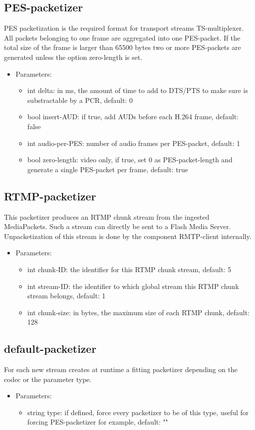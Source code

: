\subsection{PES-packetizer}
PES packetization is the required format for transport streams TS-multiplexer. All packets belonging to one frame are aggregated into one PES-packet. If the total size of the frame is larger than 65500 bytes two or more PES-packets are generated unless the option zero-length is set.
\begin{itemize}
\item Parameters:
\begin{itemize}
\item int delta: in ms, the amount of time to add to DTS/PTS to make sure is substractable by a PCR, default: 0
\item bool insert-AUD: if true, add AUDs before each H.264 frame, default: false
\item int audio-per-PES: number of audio frames per PES-packet, default: 1
\item bool zero-length: video only, if true, set 0 as PES-packet-length and generate a single PES-packet per frame, default: true
\end{itemize}
\end{itemize}
\subsection{RTMP-packetizer}
This packetizer produces an RTMP chunk stream from the ingested MediaPackets. Such a stream can directly be sent to a Flash Media Server. Unpacketization of this stream is done by the component RMTP-client internally.
\begin{itemize}
\item Parameters:
\begin{itemize}
\item int chunk-ID: the identifier for this RTMP chunk stream, default: 5
\item int stream-ID: the identifier to which global stream this RTMP chunk stream belongs, default: 1
\item int chunk-size: in bytes, the maximum size of each RTMP chunk, default: 128
\end{itemize}
\end{itemize}
\subsection{default-packetizer}
For each new stream creates at runtime a fitting packetizer depending on the codec or the parameter type.
\begin{itemize}
\item Parameters:
\begin{itemize}
\item string type: if defined, force every packetizer to be of this type, useful for forcing PES-packetizer for example, default: ""
\end{itemize}
\end{itemize}
